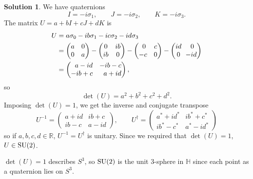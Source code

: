 \documentclass[11pt, a4paper]{report}
\theoremstyle{definition}
\newtheorem{solution}{Solution}[part]
\newenvironment{sol}{\begin{solution}}{\end{solution}\pagebreak[3]}
\newcommand*{\settightmatrix}{\ensuremath\setlength{\arraycolsep}{0.7ex}}
\newenvironment{tightmatrix}
    {\settightmatrix}{}
\newcommand*{\SU}{\ensuremath\text{SU}}
\begin{document}
\begin{sol}

We have quaternions
\[
    I = -i\sigma_1, \qquad
    J = -i\sigma_2, \qquad
    K = -i\sigma_3.
\]
The matrix $U = a + bI + cJ + dK$ is
\begin{align*}
    U &= a \sigma_0 - ib\sigma_1 -ic \sigma_2 -id \sigma_3 \\
    &= \begin{pmatrix}
        a & 0 \\
        0 & a
    \end{pmatrix}
    -
    \begin{pmatrix}
        0 & ib \\
        ib & 0
    \end{pmatrix}
    -
    \begin{pmatrix}
        \,\, 0 & c \\
        -c &  0
    \end{pmatrix}
    -
    \begin{tightmatrix}\begin{pmatrix}
        id & \,\, 0 \\
        0 & -id
    \end{pmatrix}\end{tightmatrix} \\
    &=
    \begin{pmatrix*}[r]
        a - id  & -ib - c \\
        -ib + c & a + id
    \end{pmatrix*},
\end{align*}
so
\[
    \det(U) = a^2 + b^2 + c^2 + d^2.
\]
Imposing $\det(U) = 1$, we get the inverse and conjugate transpose
\[
    U^{-1} =
        \begin{pmatrix}
            a + id & ib + c \\
            ib - c & a - id
        \end{pmatrix}, \qquad
    U^\dagger =
        \begin{pmatrix}
            a^* + id^* & ib^* + c^* \\
            ib^* -c^* & a^* - id^*
        \end{pmatrix}
\]
so if $a, b, c, d \in \mathbb{R}$, $U^{-1} = U^\dagger$ is unitary.
Since we required that $\det(U) = 1$, $U \in \SU(2)$.

$\det(U) = 1$ describes $S^3$, so $\SU(2)$ is the unit 3-sphere in $\mathbb{H}$ since each point as a quaternion lies on $S^3$.

\end{sol}
\end{document}
